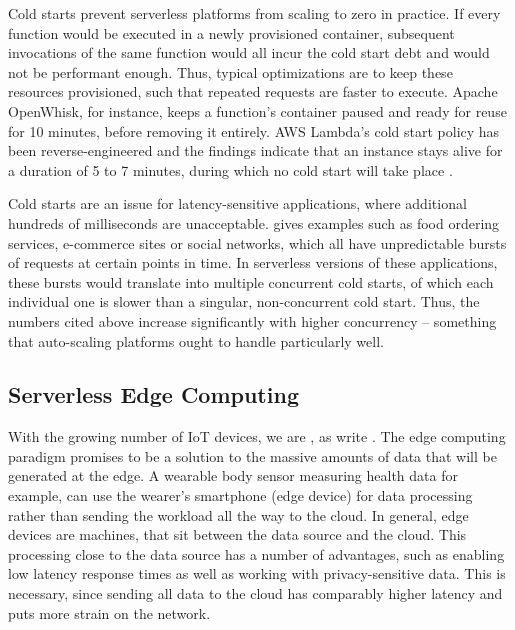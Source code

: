 Cold starts prevent serverless platforms from scaling to zero in practice. If every function would be executed in a newly provisioned container, subsequent invocations of the same function would all incur the cold start debt and would not be performant enough. Thus, typical optimizations are to keep these resources provisioned, such that repeated requests are faster to execute. Apache OpenWhisk, for instance, keeps a function's container paused and ready for reuse for 10 minutes, before removing it entirely. AWS Lambda's cold start policy has been reverse-engineered and the findings indicate that an instance stays alive for a duration of 5 to 7 minutes, during which no cold start will take place \cite{ShilCold2021}.

Cold starts are an issue for latency-sensitive applications, where additional hundreds of milliseconds are unacceptable. \citeauthor{Cui2018} gives examples such as food ordering services, e-commerce sites or social networks, which all have unpredictable bursts of requests at certain points in time. In serverless versions of these applications, these bursts would translate into multiple concurrent cold starts, of which each individual one is slower than a singular, non-concurrent cold start. Thus, the numbers cited above increase significantly with higher concurrency \cite{Mohan2019, Cui2018} -- something that auto-scaling platforms ought to handle particularly well.

\subsection{Serverless Edge Computing}


With the growing number of IoT devices, we are , as \citeauthor{Shi2016} write \cite{Shi2016}. The edge computing paradigm promises to be a solution to the massive amounts of data that will be generated at the edge. A wearable body sensor measuring health data for example, can use the wearer's smartphone (edge device) for data processing rather than sending the workload all the way to the cloud. In general, edge devices are machines, that sit between the data source and the cloud. This processing close to the data source has a number of advantages, such as enabling low latency response times as well as working with privacy-sensitive data. This is necessary, since sending all data to the cloud has comparably higher latency and puts more strain on the network.

